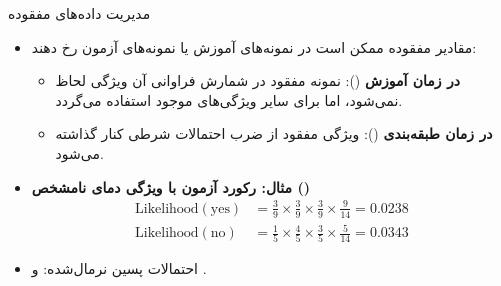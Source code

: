 \begin{frame}{مدیریت داده‌های مفقوده}{}
  \begin{itemize}
    \setlength{\itemsep}{8pt}
    \item مقادیر مفقوده ممکن است در نمونه‌های آموزش یا نمونه‌های آزمون رخ دهند:
    \begin{itemize}
      \item \textbf{در زمان آموزش} (): نمونه مفقود در شمارش فراوانی آن ویژگی لحاظ نمی‌شود، اما برای سایر ویژگی‌های موجود استفاده می‌گردد.
      \item \textbf{در زمان طبقه‌بندی} (): ویژگی مفقود از ضرب احتمالات شرطی کنار گذاشته می‌شود.
    \end{itemize}
    \item \textbf{مثال: رکورد آزمون با ویژگی دمای نامشخص ()}
    \begin{align*}
      \text{Likelihood}(\text{yes}) &= \frac{3}{9} \times \frac{3}{9} \times \frac{3}{9} \times \frac{9}{14} = 0.0238 \\[3pt]
      \text{Likelihood}(\text{no})  &= \frac{1}{5} \times \frac{4}{5} \times \frac{3}{5} \times \frac{5}{14} = 0.0343
    \end{align*}
    \item احتمالات پسین نرمال‌شده:  و .
  \end{itemize}
\end{frame}

